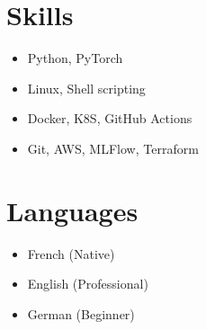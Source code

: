 \documentclass[a4paper,10pt]{article}
\begin{document}
\begin{adjustbox}{valign=t}
\begin{minipage}{0.32\textwidth}
        \section*{Skills}
        \raggedright
        \begin{itemize}
            \itemsep0em
            \item Python, PyTorch
            \item Linux, Shell scripting
            \item Docker, K8S, GitHub Actions
            \item Git, AWS, MLFlow, Terraform
        \end{itemize}
        \vspace{-.5cm}
        \section*{Languages}
        \raggedright
        \begin{itemize}
            \itemsep0em
            \item French (Native)
            \item English (Professional)
            \item German (Beginner)
        \end{itemize}
    \end{minipage}
\end{adjustbox}
\hfill
\begin{adjustbox}{valign=t}
    \begin{minipage}{0.02\textwidth}
        \MyVerticalRule
    \end{minipage}
\end{adjustbox}
\hfill
\end{document}
